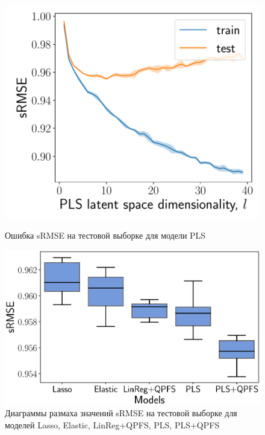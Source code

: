 \begin{figure}[ht]
	\begin{minipage}{.41\linewidth}
		\centering
		\includegraphics[width=1.\linewidth]{figs/ch2/pls_vs_k}
		\caption{ Ошибка sRMSE на тестовой выборке для модели PLS}
		\label{ch2:fig:pls_vs_k}
	\end{minipage}%
	\begin{minipage}{.55\linewidth}
		\centering
		\includegraphics[width=1.\linewidth]{figs/ch2/models2}
		\caption{Диаграммы размаха значений sRMSE на тестовой выборке для моделей Lasso, Elastic, LinReg+QPFS, PLS, PLS+QPFS}
		\label{ch2:fig:models}
	\end{minipage}
\end{figure}
